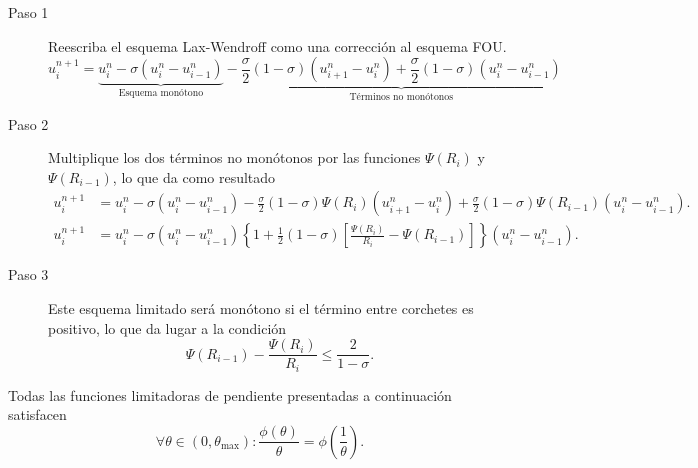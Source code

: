 \begin{description}
	\item[Paso 1]

	      Reescriba el esquema Lax-Wendroff como una corrección al esquema FOU.
	      \begin{equation*}
		      u_i^{n+1}=
		      \underbrace{
		      u_i^{n}-
		      \sigma\left(u_i^n-u_{i-1}^n\right)}_{\text{Esquema monótono}}-
		      \underbrace{
			      \frac{\sigma}{2}
			      \left(1-\sigma\right)
			      \left(u_{i+1}^{n}-u_{i}^{n}\right)+
			      \frac{\sigma}{2}\left(1-\sigma\right)
			      \left(u_{i}^{n}-u_{i-1}^{n}\right)}_{\text {Términos no monótonos}}
	      \end{equation*}

	\item[Paso 2]

	      Multiplique los dos términos no monótonos por las funciones
	      $\Psi\left(R_{i}\right)$ y $\Psi\left(R_{i-1}\right)$, lo que
	      da como resultado
	      \begin{align*}
		      u_{i}^{n+1} & =
		      u_{i}^{n}-
		      \sigma\left(u_i^n-u_{i-1}^n\right)-
		      \frac{\sigma}{2}(1-\sigma)
		      \Psi\left(R_i\right)\left(u_{i+1}^n-u_i^n\right)+
		      \frac{\sigma}{2}(1-\sigma)
		      \Psi\left(R_{i-1}\right)
		      \left(u_i^n-u_{i-1}^n\right). \\
		      u_{i}^{n+1} & =
		      u_{i}^{n}-
		      \sigma\left(u_i^n-u_{i-1}^n\right)
		      \left\{
		      1+
		      \frac{1}{2}
		      (1-\sigma)
		      \left[
			      \frac{\Psi\left(R_i\right)}{R_i}-\Psi\left(R_{i-1}\right)
			      \right]
		      \right\}
		      \left(u_i^n-u_{i-1}^n\right).
	      \end{align*}

	\item[Paso 3]
	      Este esquema limitado será monótono si el término entre
	      corchetes es positivo, lo que da lugar a la condición
	      \begin{equation*}
		      \Psi\left(R_{i-1}\right)-\frac{\Psi\left(R_{i}\right)}{R_{i}}\leq
		      \frac{2}{1-\sigma}.
	      \end{equation*}
\end{description}

Todas las funciones limitadoras de pendiente presentadas a
continuación satisfacen
\begin{equation}
	\forall\theta\in
	\left(0,\theta_{\max}\right):
	\frac{\phi\left(\theta\right)}{\theta}=
	\phi
	\left(\frac{1}{\theta}\right).\tag{Simetría}
\end{equation}

